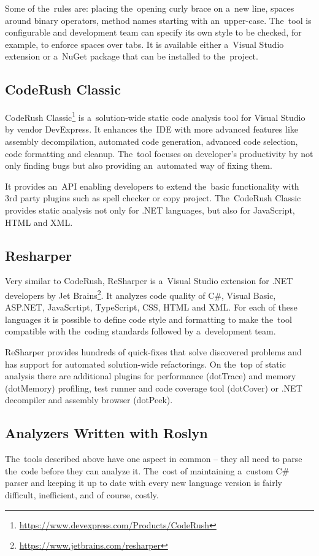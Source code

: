 \documentclass[
  digital, %
  table,   %
  lof,     %
  lot,     %
  oneside,
]{fithesis3}
\begin{document}
Some of the~rules are: placing the~opening curly brace on a~new line, spaces around binary operators, method names starting with an~upper-case. The~tool is configurable and development team can specify its own style to be checked, for example, to enforce spaces over tabs. It is available either a~Visual Studio extension or a~NuGet package that can be installed to the~project.

\subsection{CodeRush Classic}
CodeRush Classic\footnote{\url{https://www.devexpress.com/Products/CodeRush}} is a~solution-wide static code analysis tool for Visual Studio by vendor DevExpress. It enhances the~IDE with more advanced features like assembly decompilation, automated code generation, advanced code selection, code formatting and cleanup. The~tool focuses on developer's productivity by not only finding bugs but also providing an~automated way of fixing them.

It provides an~API enabling developers to extend the~basic functionality with 3rd party plugins such as spell checker or copy project. The~CodeRush Classic provides static analysis not only for .NET languages, but also for JavaScript, HTML and XML.

\subsection{Resharper}
Very similar to CodeRush, ReSharper is a~Visual Studio extension for .NET developers by Jet Brains\footnote{\url{https://www.jetbrains.com/resharper}}. It analyzes code quality of C\#, Visual Basic, ASP.NET, JavaScrtipt, TypeScript, CSS, HTML and XML. For each of these languages it is possible to define code style and formatting to make the~tool compatible with the~coding standards followed by a~development team. 

ReSharper provides hundreds of quick-fixes that solve discovered problems and has support for automated solution-wide refactorings. On the~top of static analysis there are additional plugins for performance (dotTrace) and memory (dotMemory) profiling, test runner and code coverage tool (dotCover) or .NET decompiler and assembly browser (dotPeek).


\subsection{Analyzers Written with Roslyn}
The~tools described above have one aspect in common -- they all need to parse the~code before they can analyze it. The~cost of maintaining a~custom C\# parser and keeping it up to date with every new language version is fairly difficult, inefficient, and of course, costly. 
\end{document}
